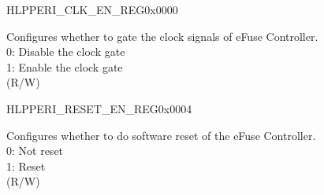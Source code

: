 \begin{register}{H}{LPPERI\_CLK\_EN\_REG}{0x0000}\label{regdesc:LPPERICLKENREG}
%
%
%
\regnewline%
\begin{regdesc}\begin{reglist}
\label{fielddesc:LPPERIEFUSECKEN}\item [LPPERI\_EFUSE\_CK\_EN] Configures whether to gate the clock signals of eFuse Controller.\\
0: Disable the clock gate \\
1: Enable the clock gate \\ (R/W)
\end{reglist}\end{regdesc}
\end{register}


\begin{register}{H}{LPPERI\_RESET\_EN\_REG}{0x0004}\label{regdesc:LPPERIRESETENREG}
%
%
%
\regnewline%
\begin{regdesc}\begin{reglist}
\label{fielddesc:LPPERIEFUSERESETEN}\item [LPPERI\_EFUSE\_RESET\_EN] Configures whether to do software reset of the eFuse Controller.\\
0: Not reset\\
1: Reset\\ (R/W)
\end{reglist}\end{regdesc}
\end{register}

